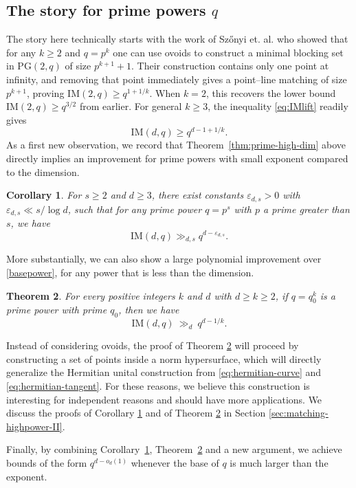 \documentclass[12pt,reqno]{amsart}
\theoremstyle{plain}
\newtheorem{theorem}{Theorem}[section]
\newtheorem{corollary}[theorem]{Corollary}
\theoremstyle{definition}
\newcommand{\IM}{\mathrm{IM}}
\newcommand{\1}{\mathbf{1}}
\begin{document}
\subsection{The story for prime powers $q$}
 The story here technically starts with the work of Sz\H{o}nyi et. al. \cite{Szonyi} who showed that for any $k \geq 2$ and $q=p^{k}$ one can use ovoids to construct a minimal blocking set in $\mathrm{PG}(2,q)$ of size $p^{k + 1} + 1$. Their construction contains only one point at infinity, and removing that point immediately gives a point--line matching of size $p^{k + 1}$, proving $\IM(2, q) \geq q^{1 + 1/k}$. When $k=2$, this recovers the lower bound $\IM(2,q) \geq q^{3/2}$ from earlier. For general $k \geq 3$, the inequality \eqref{eq:IMlift} readily gives
 \begin{equation} \label{basepower}
 \IM(d,q) \geq q^{d - 1 + 1/k}.
 \end{equation}
As a first new observation, we record that Theorem~\ref{thm:prime-high-dim} above directly implies an improvement for prime powers with small exponent compared to the dimension. 
\begin{corollary}
    \label{cor:prime-power}
    For $s \ge 2$ and $d \ge 3$, there exist constants $\varepsilon_{d, s} > 0$ with $\varepsilon_{d, s} \ll s / \log d$, such that for any prime power $q = p^s$ with $p$ a prime greater than $s$, we have
    $$\IM(d, q) \gg_{d, s} q^{d - \varepsilon_{d, s}}.$$
\end{corollary}

More substantially, we can also show a large polynomial improvement over \eqref{basepower}, for any power that is less than the dimension.
\begin{theorem}\label{thm:small-power}
For every positive integers $k$ and $d$ with $d \geq k \geq 2$, if $q=q_{0}^k$ is a prime power with prime $q_{0}$, then we have
\[
  \IM(d,q)\ \gg_{d} \ q^{d-1/k}.
\]
\end{theorem}
Instead of considering ovoids, the proof of Theorem \ref{thm:small-power} will proceed by constructing a set of points inside a norm hypersurface, which will directly generalize the Hermitian unital construction from \eqref{eq:hermitian-curve} and \eqref{eq:hermitian-tangent}. For these reasons, we believe this construction is interesting for independent reasons and should have more applications. We discuss the proofs of Corollary \ref{cor:prime-power} and of Theorem \ref{thm:small-power} in Section \ref{sec:matching-highpower-II}. 

Finally, by combining Corollary~\ref{cor:prime-power}, Theorem~\ref{thm:small-power} and a new argument, we achieve bounds of the form $q^{d - o_d(1)}$ whenever the base of $q$ is much larger than the exponent.
\end{document}
